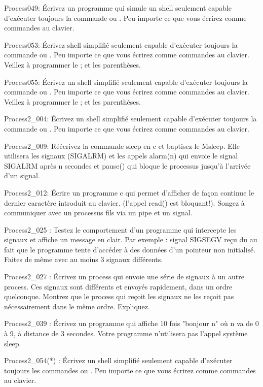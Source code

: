 \begin{list}{+}{}
\item Process049: 
Écrivez un programme qui simule un shell seulement capable d'exécuter toujours la commande
 ou . Peu importe ce que vous écrirez comme commandes au clavier.

\item Process053:
Écrivez shell simplifié seulement capable d'exécuter toujours la commande
 ou . Peu importe ce que vous écrirez comme commandes au clavier. Veillez à programmer le ; et les parenthèses.
 
\item Process055:
Écrivez un shell simplifié seulement capable d'exécuter toujours la commande
 ou . Peu importe ce que vous écrirez comme commandes au clavier. Veillez à programmer le ; et les parenthèses.
 
\item Process2\_004: 
Écrivez un shell simplifié seulement capable d'exécuter toujours la commande
 ou . Peu importe ce que vous écrirez comme commandes au clavier.

\item Process2\_009: 
Réécrivez la commande sleep en c et baptisez-le Msleep. Elle utilisera les signaux (SIGALRM) et les appels alarm(n) qui envoie le signal SIGALRM après n secondes et pause() qui bloque le processus jusqu'à l'arrivée d'un signal.

\item Process2\_012: 
Écrire un programme c qui permet d'afficher de façon continue le dernier caractère introduit au clavier. (l'appel read() est bloquant!). Songez à communiquer avec un processus fils via un pipe et un signal.

\item Process2\_025 :
Testez le comportement d'un programme qui intercepte les signaux et affiche un message en clair. Par exemple : signal SIGSEGV reçu du au fait que le programme tente d'accéder à des données d'un pointeur non initialisé. Faites de même avec au moins 3 signaux différents.

\item Process2\_027 :
Écrivez un process qui envoie une série de signaux à un autre process. Ces signaux sont différents et envoyés rapidement, dans un ordre quelconque. Montrez que le process qui reçoit les signaux ne les reçoit pas nécessairement dans le même ordre. Expliquez.

\item Process2\_039 :
Écrivez un programme qui affiche 10 fois "bonjour n" où n va de 0 à 9, à distance de 3 secondes. Votre programme n'utilisera pas l'appel système sleep. 

\item Process2\_054(*) :
Écrivez un shell simplifié seulement capable d'exécuter toujours les commandes
 ou . Peu importe ce que vous écrirez comme commandes au clavier.

\end{list}

